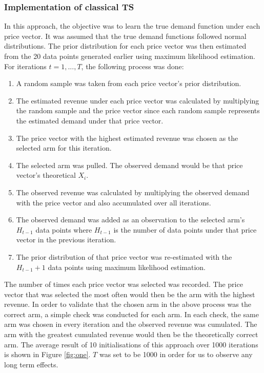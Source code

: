 \documentclass[a4paper]{article}
\begin{document}
\subsubsection{Implementation of classical TS}
In this approach, the objective was to learn the true demand function under each price vector. It was assumed that the true demand functions followed normal distributions. The prior distribution for each price vector was then estimated from the 20 data points generated earlier using maximum likelihood estimation. 
\newline
\newline
For iterations $t = 1,...,T$, the following process was done:
\begin{enumerate}
	\item A random sample was taken from each price vector's prior distribution.
	\item The estimated revenue under each price vector was calculated by multiplying the random sample and the price vector since each random sample represents the estimated demand under that price vector.
	\item The price vector with the highest estimated revenue was chosen as the selected arm for this iteration.
	\item The selected arm was pulled. The observed demand would be that price vector's theoretical $X_i$.
	\item The observed revenue was calculated by multiplying the observed demand with the price vector and also accumulated over all iterations.
	\item The observed demand was added as an observation to the selected arm's $H_{t-1}$ data points where $H_{t-1}$ is the number of data points under that price vector in the previous iteration.
	\item The prior distribution of that price vector was re-estimated with the $H_{t-1} + 1$ data points using maximum likelihood estimation.
\end{enumerate}
The number of times each price vector was selected was recorded. The price vector that was selected the most often would then be the arm with the highest revenue.
\newline
\newline
In order to validate that the chosen arm in the above process was the correct arm, a simple check was conducted for each arm. In each check, the same arm was chosen in every iteration and the observed revenue was cumulated. The arm with the greatest cumulated revenue would then be the theoretically correct arm. The average result of 10 initialisations of this approach over 1000 iterations is shown in Figure \ref{fig:one}. $T$ was set to be 1000 in order for us to observe any long term effects.
\end{document}
